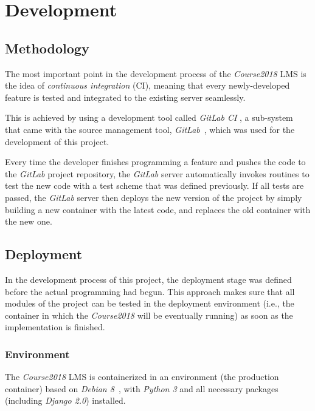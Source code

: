 

\chapter{Development}
\label{chap:DEV}

\section{Methodology}
The most important point in the development process of the \emph{Course2018}
LMS is the idea of \emph{continuous integration} (CI), meaning that every
newly-developed feature is tested and integrated to the existing server seamlessly.

\medskip
This is achieved by using a development tool called \emph{GitLab CI}
\cite{BgitlabCI}, a sub-system that came with the source management tool,
\emph{GitLab}~\cite{Agitlab}, which was used for the development of this
project. 

\medskip

Every time
the developer finishes programming a feature and pushes the code to the
\emph{GitLab} project repository, the \emph{GitLab} server automatically
invokes 
routines to test the new code with a test scheme that was defined previously.
If all tests are passed, 
the \emph{GitLab} server then deploys the new version of the project by simply
building a new container with the latest code, and replaces the old
container with the new one. 

\section{Deployment}
In the development process of this project, the deployment stage was defined
before the actual programming had begun. This approach makes sure that all
modules of the project can be tested in the
deployment environment (i.e., the container in which the \emph{Course2018}
will be eventually running) as soon as the implementation is finished.

\subsection{Environment}
The \emph{Course2018} LMS is containerized in an environment
(the production container) based on
\emph{Debian 8}~\cite{debian}, with \emph{Python 3} and all necessary packages
(including \emph{Django 2.0}) installed.

